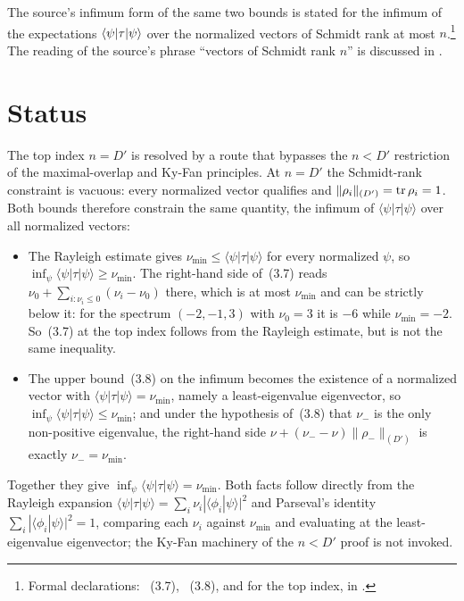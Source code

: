 \documentclass{article}
\begin{document}
The source's infimum form of the same two bounds is stated for the infimum of
the expectations $\langle \psi|\tau|\psi\rangle$ over the normalized vectors of
Schmidt rank at most $n$.\footnote{Formal declarations:
    ~(3.7),
    ~(3.8), and
     for the top
    index, in .} The
reading of the source's phrase ``vectors of Schmidt rank $n$'' is discussed in
.

\section{Status}

The top index $n=D'$ is resolved by a route that bypasses the $n<D'$ restriction
of the maximal-overlap and Ky-Fan principles. At $n=D'$ the Schmidt-rank
constraint is vacuous: every normalized vector qualifies and
$\|\rho_i\|_{(D')}=\operatorname{tr}\rho_i=1$. Both bounds therefore constrain the same quantity,
the infimum of $\langle\psi|\tau|\psi\rangle$ over all normalized vectors:
\begin{itemize}
  \item The Rayleigh estimate gives $\nu_{\min}\le\langle\psi|\tau|\psi\rangle$
  for every normalized $\psi$, so $\inf_\psi\langle\psi|\tau|\psi\rangle\ge
  \nu_{\min}$. The right-hand side of~(3.7) reads
  $\nu_0+\sum_{i:\nu_i\le0}(\nu_i-\nu_0)$ there, which is at most $\nu_{\min}$
  and can be strictly below it: for the spectrum $(-2,-1,3)$ with $\nu_0=3$ it is
  $-6$ while $\nu_{\min}=-2$. So~(3.7) at the top index follows from the Rayleigh
  estimate, but is not the same inequality.
  \item The upper bound~(3.8) on the infimum becomes the existence of a normalized
  vector with $\langle\psi|\tau|\psi\rangle=\nu_{\min}$, namely a least-eigenvalue
  eigenvector, so $\inf_\psi\langle\psi|\tau|\psi\rangle\le\nu_{\min}$; and under
  the hypothesis of~(3.8) that $\nu_-$ is the only non-positive eigenvalue, the
  right-hand side $\nu+(\nu_--\nu)\|\rho_-\|_{(D')}$ is exactly $\nu_-=\nu_{\min}$.
\end{itemize}
Together they give $\inf_\psi\langle\psi|\tau|\psi\rangle=\nu_{\min}$. Both facts
follow directly from the Rayleigh expansion $\langle\psi|\tau|\psi\rangle=\sum_i
\nu_i|\langle\phi_i|\psi\rangle|^2$ and Parseval's identity $\sum_i
|\langle\phi_i|\psi\rangle|^2=1$, comparing each $\nu_i$ against $\nu_{\min}$ and
evaluating at the least-eigenvalue eigenvector; the Ky-Fan machinery of the $n<D'$
proof is not invoked.
\end{document}
